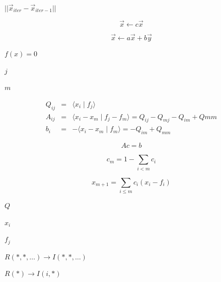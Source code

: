 \documentclass{article}
\begin{document}
$|| \vec{x}_{iter} -
                 \vec{x}_{iter-1}||$
\pagebreak

\[ \vec{x} \leftarrow c \vec{x} \]
\pagebreak

\[ \vec{x} \leftarrow a \vec{x} + b \vec{y} \]
\pagebreak

$ f(x)=0 $
\pagebreak

$
j $
\pagebreak

$ m $
\pagebreak

\begin{eqnarray*}
Q_{i j} & = & \langle x_i \mid f_j \rangle \\
A_{i j} & = & \langle x_i - x_m \mid f_j - f_m \rangle = Q_{i j} - Q_{m j} - Q_{i m} + Q{m m} \\
b_i & =& -\langle x_i - x_m \mid f_m \rangle = -Q_{i m} + Q_{m m}
\end{eqnarray*}
\pagebreak

\[
A c = b
\]
\pagebreak

\[
c_m = 1 - \sum_{i<m} c_i
\]
\pagebreak

\[
x_{m+1} = \sum_{i \le m}{c_i ( x_i - f_i)}
\]
\pagebreak

$ Q $
\pagebreak

$ x_i $
\pagebreak

$ f_j $
\pagebreak

$ R(*,*,\ldots) \rightarrow I(*,*,\ldots) $
\pagebreak

$ R(*) \rightarrow I(i,*) $
\pagebreak
\end{document}
